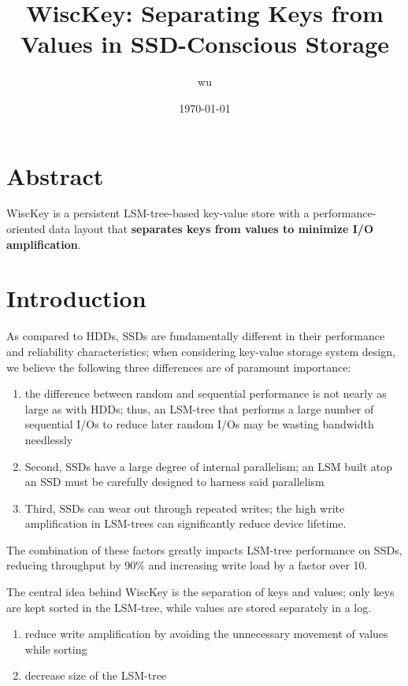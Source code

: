 \documentclass[11pt]{article}
\author{wu}
\date{\today}
\title{WiscKey: Separating Keys from Values in SSD-Conscious Storage}
\begin{document}
\maketitle
\section{Abstract}
\label{sec:orge940db8}
WiscKey is a persistent LSM-tree-based key-value store with a performance-oriented data layout that
\textbf{separates keys from values to minimize I/O amplification}.
\section{Introduction}
\label{sec:org9437f3d}
As compared to HDDs, SSDs are fundamentally different in their performance and reliability
characteristics; when considering key-value storage system design, we believe the following three
differences are of paramount importance:
\begin{enumerate}
\item the difference between random and sequential performance is not nearly as large as with HDDs; thus,
an LSM-tree that performs a large number of sequential I/Os to reduce later random I/Os may be
wasting bandwidth needlessly
\item Second, SSDs have a large degree of internal parallelism; an LSM built atop an SSD must be
carefully designed to harness said parallelism
\item Third, SSDs can wear out through repeated writes; the high write ampliﬁcation in LSM-trees can
signiﬁcantly reduce device lifetime.
\end{enumerate}

The combination of these factors greatly impacts LSM-tree performance on SSDs, reducing throughput by
90\% and increasing write load by a factor over 10.

The central idea behind WiscKey is the separation of keys and values; only keys are kept sorted in the
LSM-tree, while values are stored separately in a log.
\begin{enumerate}
\item reduce write amplification by avoiding the unnecessary movement of values while sorting
\item decrease size of the LSM-tree
\end{enumerate}
\end{document}

